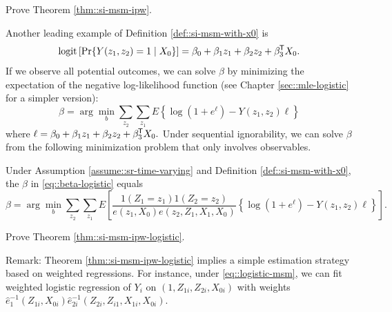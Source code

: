 \begin{HomeworkProblem}\label{exr:29-3}


Prove Theorem \ref{thm::si-msm-ipw}.


\end{HomeworkProblem}

\begin{HomeworkProblem}\label{exr:29-4}


Another leading example of Definition \ref{def::si-msm-with-x0} is
\begin{equation}\label{eq::logistic-msm}
\text{logit} \left[ \operatorname{Pr}\{  Y(z_1, z_2)  =1  \mid X_0\}  \right] = \beta_0 + \beta_1 z_1 + \beta_2 z_2 + \beta_3^{\mkern-1.5mu\mathsf{T}} X_0 .
\end{equation}
If we observe all potential outcomes, we can solve $\beta$ by minimizing the expectation of the negative log-likelihood function (see Chapter \ref{sec::mle-logistic} for a simpler version):
\begin{equation}
\beta = \arg\min_b   \sum_{z_2}\sum_{z_1}  E\left\{   \log (1 + e^{\ell })
- Y(z_1, z_2)  \ell  \right\}
\end{equation}
where $\ell = \beta_0 + \beta_1 z_1 + \beta_2 z_2 + \beta_3^{\mkern-1.5mu\mathsf{T}} X_0.$
Under sequential ignorability, we can solve $\beta$ from the following minimization problem that only involves observables.


\begin{Theorem}
\label{thm::si-msm-ipw-logistic}
Under Assumption \ref{assume::sr-time-varying} and Definition \ref{def::si-msm-with-x0}, the $\beta$ in \eqref{eq::beta-logistic} equals
\[
\beta = \arg\min_b \sum_{z_2}\sum_{z_1}  E\left[   \frac{  1(Z_1=z_1) 1(Z_2=z_2)   }{   e(z_1, X_0) e(z_2, Z_1, X_1, X_0)     }
\left\{   \log (1 + e^{\ell })
- Y(z_1, z_2)  \ell  \right\} \right] .
\]
\end{Theorem}

Prove Theorem \ref{thm::si-msm-ipw-logistic}.

Remark:
Theorem \ref{thm::si-msm-ipw-logistic} implies a simple estimation strategy based on weighted regressions. For instance, under \eqref{eq::logistic-msm}, we can fit weighted logistic regression of $Y_i$ on $(1,Z_{1i}, Z_{2i}, X_{0i})$ with weights $\hat{e}_{1}^{-1}(Z_{1i}, X_{0i})  \hat{e}_{2i}^{-1}(Z_{2i}, Z_{i1}, X_{1i}, X_{0i})$.






\end{HomeworkProblem}

